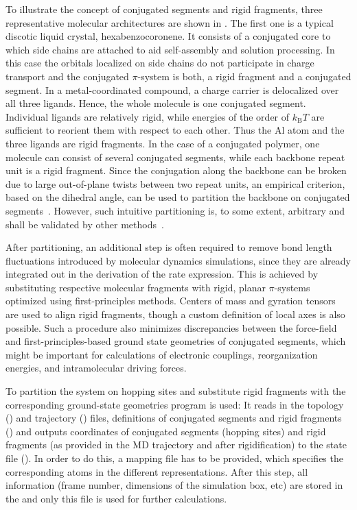 To illustrate the concept of conjugated segments and rigid fragments, three 
representative molecular architectures are shown in . The first one 
is a typical discotic liquid crystal, hexabenzocoronene. It consists of a 
conjugated core to which side chains are attached to aid self-assembly and 
solution processing. In this case the orbitals localized on side chains do not 
participate in charge transport and the conjugated $\pi$-system is both, a rigid 
fragment and a conjugated segment. 
%
In a metal-coordinated compound, a charge carrier is delocalized over all 
three ligands. Hence, the whole molecule is one conjugated segment. Individual 
ligands are relatively rigid, while energies of the order of $k_\text{B}T$ are 
sufficient to reorient them with respect to each other. Thus the Al atom and the 
three ligands are rigid fragments.
%
In the case of a conjugated polymer, one molecule can consist of several 
conjugated segments, while each backbone repeat unit is a rigid fragment. Since 
the conjugation along the backbone can be broken due to large out-of-plane 
twists between two repeat units, an empirical criterion, based on the dihedral 
angle, can be used to partition the backbone on conjugated 
segments~\cite{ruhle_multiscale_2010}. However, such intuitive partitioning is, 
to some extent, arbitrary and shall be validated by other 
methods~\cite{vukmirovic_charge_2008,vukmirovic_charge_2009,mcmahon_ad_2009}. 

After partitioning, an additional step is often required to remove bond length 
fluctuations introduced by molecular dynamics simulations, since they are 
already integrated out in the derivation of the rate expression. This is 
achieved by substituting respective molecular fragments with  rigid, planar 
$\pi$-systems optimized using first-principles methods. 
Centers of mass and gyration tensors are used to align rigid fragments, though a 
custom definition of local axes is also possible. Such a procedure also 
minimizes discrepancies between the force-field and first-principles-based 
ground state geometries of conjugated segments, which might be important for 
calculations of electronic couplings, reorganization energies, and 
intramolecular driving forces. 

To partition the system on hopping sites and substitute rigid fragments with the 
corresponding ground-state geometries \xtpmap program is used:
It reads in the \gromacs topology (\topology) and trajectory (\trajectory) 
files, definitions of conjugated segments and rigid fragments (\xmlmap) and 
outputs coordinates of conjugated segments (hopping sites) and rigid fragments 
(as provided in the MD trajectory and after rigidification) to the  state file 
(\sqlstate). In order to do this, a mapping file \xmlmap has to be provided, 
which specifies the corresponding atoms in the different representations. After 
this step, all information (frame number, dimensions of the simulation box, etc) 
are stored in the  and only this file is used for 
further calculations.

